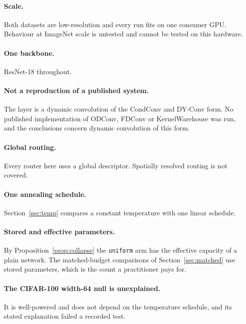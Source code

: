 \documentclass[10pt,a4paper]{article}
\begin{document}
\paragraph{Scale.} Both datasets are low-resolution and every run fits on
one consumer GPU. Behaviour at ImageNet scale is untested and cannot be
tested on this hardware.

\paragraph{One backbone.} ResNet-18 throughout.

\paragraph{Not a reproduction of a published system.} The layer is a
dynamic convolution of the CondConv and DY-Conv form. No published
implementation of ODConv, FDConv or KernelWarehouse was run, and the
conclusions concern dynamic convolution of this form.

\paragraph{Global routing.} Every router here uses a global descriptor.
Spatially resolved routing is not covered.

\paragraph{One annealing schedule.} Section~\ref{sec:temp} compares a
constant temperature with one linear schedule.

\paragraph{Stored and effective parameters.} By
Proposition~\ref{prop:collapse} the \texttt{uniform} arm has the
effective capacity of a plain network. The matched-budget comparisons of
Section~\ref{sec:matched} use stored parameters, which is the count a
practitioner pays for.

\paragraph{The CIFAR-100 width-64 null is unexplained.} It is
well-powered and does not depend on the temperature schedule, and its
stated explanation failed a recorded test.
\end{document}
